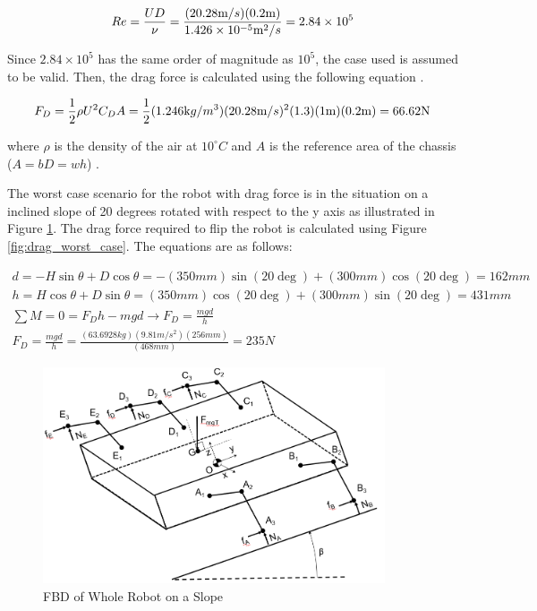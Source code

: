 \begin{equation}
    Re = \frac{UD}{\nu} = \frac{(20.28 \text m/s)(0.2 \text m)}{1.426 \times 10^{-5} \text m^2/s } = 2.84 \times 10^{5}
\end{equation}

Since $2.84 \times 10^5$ has the same order of magnitude as $10^5$, the case used is assumed to be valid. Then, the drag force is calculated using the following equation \cite{munson_fundamentals_2009}.

\begin{equation} 
    F_D = \frac{1}{2}\rho U^2 C_D A = \frac{1}{2}(1.246 \text kg/m^3)(20.28 \text m/s)^2(1.3)(1 \text m)(0.2 \text m) = 66.62 \text N
\end{equation}

where $\rho$ is the density of the air at $10 ^{\circ} C$ and $A$ is the reference area of the chassis ($A = bD = wh$) \cite{engineers_edge_viscosity_2019}.

The worst case scenario for the robot with drag force is in the situation on a inclined slope of 20 degrees rotated with respect to the y axis as illustrated in Figure \ref{fig:crab_side_slope}. The drag force required to flip the robot is calculated using Figure \ref{fig:drag_worst_case}. The equations are as follows:

\begin{gather}
    d = -H\sin\theta + D\cos\theta = -(350 mm)\sin(20 \deg) + (300 mm)\cos(20\deg) = 162 mm
    \\
    h = H \cos\theta + D\sin\theta = (350 mm)\cos(20\deg) + (300 mm)\sin(20\deg) = 431 mm 
    \\
    \sum M = 0 = F_D h - mgd \xrightarrow{} F_D =  \frac{mgd}{h} \\
   F_D =  \frac{mgd}{h} = \frac{(63.6928 kg)(9.81 m/s^2)(256 mm)}{(468 mm)} = 235 N
\end{gather}

\begin{figure}
    \centering
    \includegraphics[width=0.9\textwidth]{4_ComponentProperties/img/robot_ext_fbd_slope_side.PNG}
    \caption{FBD of Whole Robot on a Slope}
    \label{fig:crab_side_slope}
\end{figure}

